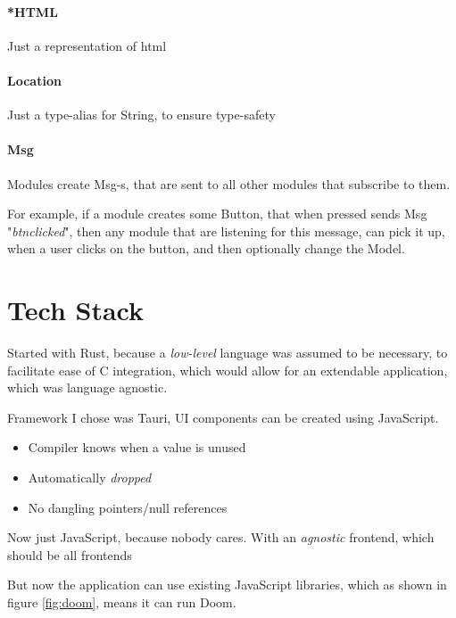 \paragraph{*HTML}
Just a representation of \gls{html}


\paragraph{Location}
Just a type-alias for String, to ensure type-safety


\paragraph{Msg}
Modules create Msg-s, that are sent to all other modules that subscribe to them.

For example, if a module creates some Button, that when pressed sends
Msg "\textit{btn\-clicked}", then any module that are listening for this message,
can pick it up, when a user clicks on the button, and then optionally change the
Model.

\section{Tech Stack}

Started with Rust, because a \textit{low-level} language was assumed to be
necessary, to facilitate ease of C integration, which would allow for an
extendable application, which was language agnostic.

Framework I chose was Tauri, UI components can be created using JavaScript.

\begin{itemize}
  \item Compiler knows when a value is unused
  \item Automatically \textit{dropped}
  \item No dangling pointers/null references
\end{itemize}

Now just JavaScript, because nobody cares. With an \textit{agnostic} frontend,
which should be all frontends

But now the application can use existing JavaScript libraries, which as shown in
figure \ref{fig:doom}, means it can run Doom.

